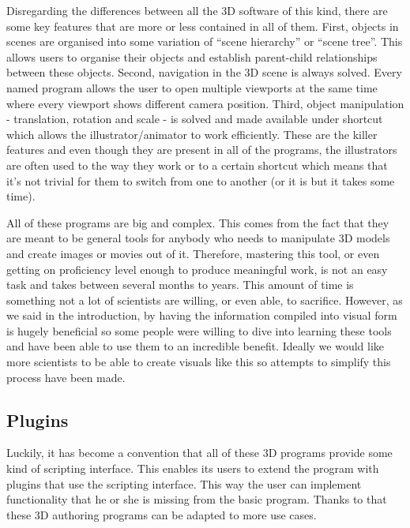 \documentclass[
  digital, %
  table,   %
  nolof,     %
  nolot,     %
]{fithesis3}
\begin{document}
Disregarding the differences between all the 3D software of this kind, there are some key features that are more or less contained in all of them. First, objects in scenes are organised into some variation of ``scene hierarchy'' or ``scene tree''. This allows users to organise their objects and establish parent-child relationships between these objects. Second, navigation in the 3D scene is always solved. Every named program allows the user to open multiple viewports at the same time where every viewport shows different camera position. Third, object manipulation - translation, rotation and scale - is solved and made available under shortcut which allows the illustrator/animator to work efficiently.
These are the killer features and even though they are present in all of the programs, the illustrators are often used to the way they work or to a certain shortcut which means that it's not trivial for them to switch from one to another (or it is but it takes some time).

All of these programs are big and complex. This comes from the fact that they are meant to be general tools for anybody who needs to manipulate 3D models and create images or movies out of it. Therefore, mastering this tool, or even getting on proficiency level enough to produce meaningful work, is not an easy task and takes between several months to years. This amount of time is something not a lot of scientists are willing, or even able, to sacrifice. However, as we said in the introduction, by having the information compiled into visual form is hugely beneficial so some people were willing to dive into learning these tools and have been able to use them to an incredible benefit. Ideally we would like more scientists to be able to create visuals like this so attempts to simplify this process have been made.

\subsection{Plugins}
Luckily, it has become a convention that all of these 3D programs provide some kind of scripting interface. This enables its users to extend the program with plugins that use the scripting interface. This way the user can implement functionality that he or she is missing from the basic program. Thanks to that these 3D authoring programs can be adapted to more use cases.
\end{document}
